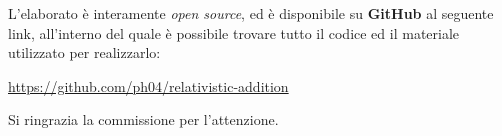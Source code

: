 \documentclass{article}
\begin{document}
L'elaborato è interamente \textit{open source},
ed è disponibile su \textbf{GitHub} al seguente link, all'interno
del quale è possibile trovare tutto il codice ed il materiale
utilizzato per realizzarlo:

\url{https://github.com/ph04/relativistic-addition}\hfill\break

Si ringrazia la commissione per l'attenzione.

\pagebreak

\tableofcontents
\end{document}
